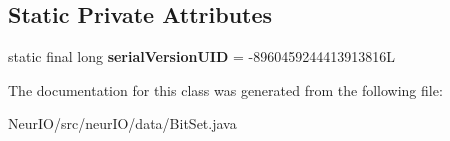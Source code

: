\subsection*{Static Private Attributes}
\begin{DoxyCompactItemize}
\item 
\mbox{\label{classneur_i_o_1_1data_1_1_bit_set_a65b3856567b2b7fee83193e320fe11e2}} 
static final long {\bfseries serial\+Version\+U\+ID} = -\/8960459244413913816L
\end{DoxyCompactItemize}


The documentation for this class was generated from the following file\+:\begin{DoxyCompactItemize}
\item 
Neur\+I\+O/src/neur\+I\+O/data/Bit\+Set.\+java\end{DoxyCompactItemize}
